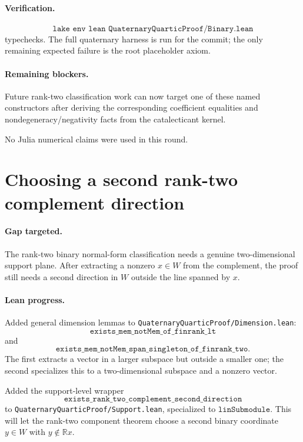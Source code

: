 \documentclass[11pt]{article}
\begin{document}
\paragraph{Verification.}
\[
\texttt{lake env lean QuaternaryQuarticProof/Binary.lean}
\]
typechecks.  The full quaternary harness is run for the commit; the only
remaining expected failure is the root placeholder axiom.

\paragraph{Remaining blockers.}
Future rank-two classification work can now target one of these named
constructors after deriving the corresponding coefficient equalities and
nondegeneracy/negativity facts from the catalecticant kernel.

No Julia numerical claims were used in this round.

\section*{Choosing a second rank-two complement direction}

\paragraph{Gap targeted.}
The rank-two binary normal-form classification needs a genuine two-dimensional
support plane.  After extracting a nonzero \(x\in W\) from the complement, the
proof still needs a second direction in \(W\) outside the line spanned by \(x\).

\paragraph{Lean progress.}
Added general dimension lemmas to \texttt{QuaternaryQuarticProof/Dimension.lean}:
\[
\texttt{exists\_mem\_notMem\_of\_finrank\_lt}
\]
and
\[
\texttt{exists\_mem\_notMem\_span\_singleton\_of\_finrank\_two}.
\]
The first extracts a vector in a larger subspace but outside a smaller one;
the second specializes this to a two-dimensional subspace and a nonzero vector.

Added the support-level wrapper
\[
\texttt{exists\_rank\_two\_complement\_second\_direction}
\]
to \texttt{QuaternaryQuarticProof/Support.lean}, specialized to
\(\texttt{linSubmodule}\).  This will let the rank-two component theorem choose
a second binary coordinate \(y\in W\) with \(y\notin\mathbb{R}x\).
\end{document}
